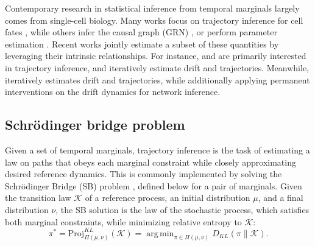 \documentclass[twoside,11pt]{article}
\DeclareMathOperator*{\argmin}{arg\,min}
\begin{document}
Contemporary research in statistical inference from temporal marginals largely comes from single-cell biology. Many works focus on trajectory inference for cell fates \citep{schiebinger2019optimal, lavenant2021towards,yachimura2023scegot, chizat2022trajectory}, while others infer the causal graph (GRN) \citep{aalto2020gene,brouillard2020differentiable, tejada2023causal, rohbeck2024bicycle}, or perform parameter estimation \citep{chakraborty2009parameter, shen2024learning}. Recent works jointly estimate a subset of these quantities by leveraging their intrinsic relationships. For instance, \citet{vargas2021solving} and \citet{shen2024multi} are primarily interested in trajectory inference, and iteratively estimate drift and trajectories. Meanwhile, \citet{zhang2024joint} iteratively estimates drift and trajectories, while additionally applying permanent interventions on the drift dynamics for network inference. 








\subsection{Schr\"odinger bridge problem}
Given a set of temporal marginals, trajectory inference is the task of estimating a law on paths that obeys each marginal constraint while closely approximating desired reference dynamics. This is commonly implemented by solving the Schr\"odinger Bridge (SB) problem \citep{chizat2022trajectory, shen2024learning}, defined below for a pair of marginals. Given the transition law $\mathcal{K}$ of a reference process, an initial distribution $\mu$, and a final distribution $\nu$, the SB solution is the law of the stochastic process, which satisfies both marginal constraints, while minimizing relative entropy to $\mathcal{K}$:
\begin{equation}
\pi^* = \text{Proj}_{\Pi(\mu,\nu)}^{KL}(\mathcal{K}) = \argmin_{\pi \in \Pi(\mu,\nu)} D_{KL}(\pi \| \mathcal{K}).
\label{eq: schrodinger_bridge}
\end{equation}
\end{document}
